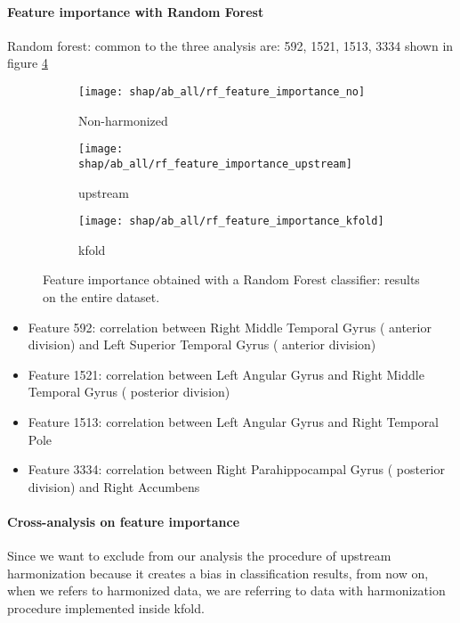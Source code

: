\documentclass[11pt]{report}
\begin{document}
\paragraph{Feature importance with Random Forest}


Random forest: common to the three analysis are: 592, 1521, 1513, 3334 shown in figure \ref{fig:shap_ab1}


\begin{figure}
\centering
\begin{subfigure}[b]{.45\textwidth}
   \texttt{[image: shap/ab\_all/rf\_feature\_importance\_no]}
   \caption{Non-harmonized}
   \label{}
\end{subfigure}
\begin{subfigure}[b]{.45\textwidth}
   \texttt{[image: shap/ab\_all/rf\_feature\_importance\_upstream]}
   \caption{upstream}
   \label{}
\end{subfigure}
\begin{subfigure}[b]{.45\textwidth}
   \texttt{[image: shap/ab\_all/rf\_feature\_importance\_kfold]}
   \caption{kfold}
   \label{}
\end{subfigure}
\caption{Feature importance obtained with a Random Forest classifier: results on the entire dataset.}
\label{fig:shap_ab1}
\end{figure}



\begin{itemize}
\item Feature 592: correlation between Right Middle Temporal Gyrus ( anterior division) and Left Superior Temporal Gyrus ( anterior division)
\item Feature 1521: correlation between Left Angular Gyrus  and Right Middle Temporal Gyrus ( posterior division)
\item Feature 1513: correlation between Left Angular Gyrus  and Right Temporal Pole
\item Feature 3334: correlation between Right Parahippocampal Gyrus ( posterior division) and Right Accumbens
\end{itemize}


\paragraph{Cross-analysis on feature importance}

Since we want to exclude from our analysis the procedure of upstream harmonization because it creates a bias in classification results, from now on, when we refers to harmonized data, we are referring to data with harmonization procedure implemented inside kfold.
\end{document}
